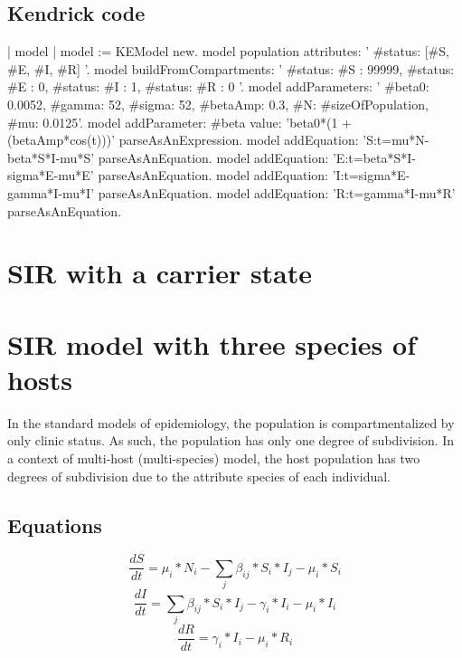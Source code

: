 \documentclass[a4paper,10pt,twoside]{book}
\begin{document}
\subsection{ Kendrick code}

\begin{code}{}
	| model |
	model := KEModel new.
	model population attributes: '{ #status: [#S, #E, #I, #R] }'.
	model
		buildFromCompartments:
			'{
		{ #status: #S }: 99999,
		{ #status: #E }: 0,
		{ #status: #I }: 1,
		{ #status: #R }: 0
	}'.
	model addParameters: '{
		#beta0: 0.0052,
		#gamma: 52,
		#sigma: 52,
		#betaAmp: 0.3,
		#N: #sizeOfPopulation,
		#mu: 0.0125}'.
	model
		addParameter: #beta
		value: 'beta0*(1 + (betaAmp*cos(t)))' parseAsAnExpression.
	model
		addEquation: 'S:t=mu*N-beta*S*I-mu*S' parseAsAnEquation.
	model
		addEquation: 'E:t=beta*S*I-sigma*E-mu*E' parseAsAnEquation.
	model
		addEquation: 'I:t=sigma*E-gamma*I-mu*I' parseAsAnEquation.
	model
		addEquation: 'R:t=gamma*I-mu*R' parseAsAnEquation.
\end{code}

\section{ SIR with a carrier state}\section{ SIR model with three species of hosts}
In the standard models of epidemiology, the population is compartmentalized by only clinic status.
As such, the population has only one degree of subdivision.
In a context of multi-host (multi-species) model, the host population has two degrees of subdivision due to the attribute species of each individual.
\subsection{ Equations}

  \begin{equation}
    \frac{dS}{dt} = \mu_i*N_i - \sum_j \beta_{ij}*S_i*I_j - \mu_i*S_i
  \end{equation}
  \begin{equation}
    \frac{dI}{dt} = \sum_j \beta_{ij}*S_i*I_j - \gamma_i*I_i - \mu_i*I_i
  \end{equation}
  \begin{equation}
    \frac{dR}{dt} = \gamma_i*I_i - \mu_i*R_i
  \end{equation}
  
\end{document}
